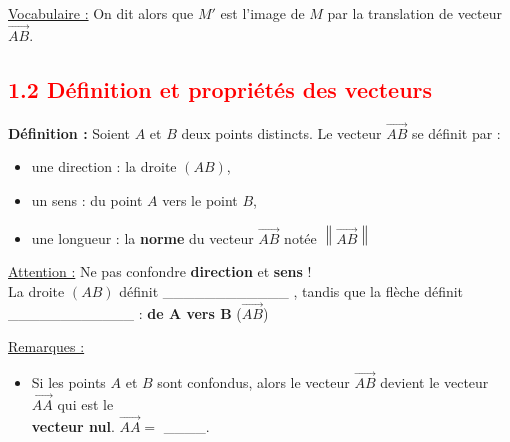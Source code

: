 \documentclass[12pt]{article}
\newcommand*{\norme}[1]{\left\lVert\overrightarrow{#1}\right\rVert}
\begin{document}
\underline{Vocabulaire :} On dit alors que $M'$ est l'image de $M$ par la translation de vecteur
$\overrightarrow{AB}$.

\vspace{10pt}


\subsection*{\textcolor{red}{1.2 Définition et propriétés des vecteurs}}

\vspace{5pt}

\begin{mdframed}[
    linewidth=1pt,
    roundcorner=5pt,
    linecolor=ForestGreen
]
{\color{ForestGreen}\textbf{Définition :}}
Soient $A$ et $B$ deux points distincts. Le vecteur $\overrightarrow{AB}$ se définit par :
\begin{itemize}
    \item une direction : la droite $(AB)$,
    \item un sens : du point $A$ vers le point $B$,
    \item une longueur : la \textbf{norme} du vecteur $\overrightarrow{AB}$ notée $\norme{AB}$
\end{itemize}
\end{mdframed}

\vspace{5pt}

{\color{red}\underline{Attention :} } Ne pas confondre \textbf{direction} et \textbf{sens} !
\vspace{10pt}
\\La droite $(AB)$ définit \_\_\_\_\_\_\_\_\_\_\_\_ , tandis que la flèche définit 
\_\_\_\_\_\_\_\_\_\_\_\_ : \textbf{de $\bm{A}$ vers $\bm{B}$} ($\overrightarrow{AB}$)

\vspace{10pt}

\underline{Remarques :}
\vspace{5pt}
\begin{itemize}
    \item Si les points $A$ et $B$ sont confondus, alors le vecteur $\overrightarrow{AB}$ devient le
    vecteur $\overrightarrow{AA}$ qui est le 
    \vspace{5pt}
    \\\textbf{vecteur nul}. $\overrightarrow{AA} = $ 
    \_\_\_\_.
\end{itemize}
\end{document}
